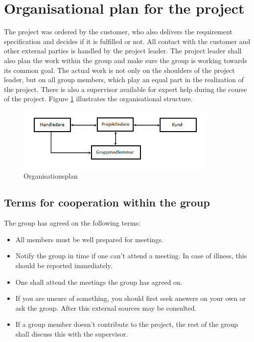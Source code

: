 \section{Organisational plan for the project}
The project was ordered by the customer, who also delivers the requirement specification and decides if it is fulfilled or not. All contact with the customer and other external parties is handled by the project leader. The project leader shall also plan the work within the group and make sure the group is working towards its common goal. The actual work is not only on the shoulders of the project leader, but on all group members, which play an equal part in the realization of the project. There is also a supervisor available for expert help during the course of the project. Figure \ref{organisationsplan} illustrates the organisational structure.

\begin{figure}[H]
  \begin{center}
    \includegraphics[keepaspectratio=true,width=375px]{../grafik/organisationsplan.png}
    \caption{Organisationsplan}
    \label{organisationsplan}
  \end{center}
\end{figure}

\subsection{Terms for cooperation within the group}
The group has agreed on the following terms:

\begin{itemize}
\item{All members must be well prepared for meetings.}
\item{Notify the group in time if one can't attend a meeting. In case of illness, this should be reported immediately.}
\item{One shall attend the meetings the group has agreed on.}
\item{If you are unsure of something, you should first seek answers on your own or ask the group. After this external sources may be consulted.}
\item{If a group member doesn't contribute to the project, the rest of the group shall discuss this with the supervisor.}
\end{itemize}

\newpage
